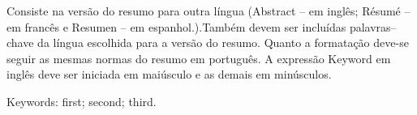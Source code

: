 \begin{resumo}[Abstract]

\setlength{\baselineskip}{1.5\baselineskip} %

Consiste na versão do resumo para outra língua (Abstract – em inglês; Résumé – em francês e Resumen – em espanhol.).Também devem ser incluídas palavras–chave da língua escolhida para a versão do resumo. Quanto a formatação deve-se seguir as mesmas normas do resumo em português. A expressão Keyword em inglês deve ser iniciada em maiúsculo e as demais em minúsculos.

   \vspace{\onelineskip}
 
   \noindent 
  Keywords: first; second; third.

\end{resumo}
